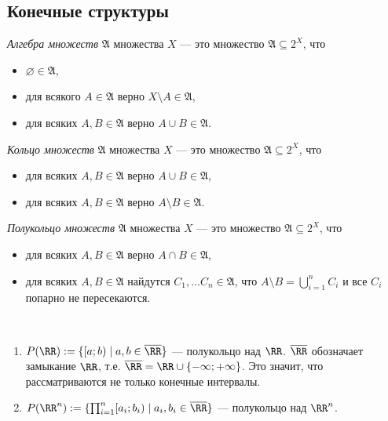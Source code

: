 \documentclass[12pt,a4paper]{article}
\begin{document}
    \subsection{Конечные структуры}

    \begin{definition}
        \emph{Алгебра множеств} $\mathfrak{A}$ множества $X$ --- это множество $\mathfrak{A} \subseteq 2^X$, что
        \begin{itemize}
            \item $\varnothing \in \mathfrak{A}$,
            \item для всякого $A \in \mathfrak{A}$ верно $X \setminus A \in \mathfrak{A}$,
            \item для всяких $A, B \in \mathfrak{A}$ верно $A \cup B \in \mathfrak{A}$.
        \end{itemize}
        
        \emph{Кольцо множеств} $\mathfrak{A}$ множества $X$ --- это множество $\mathfrak{A} \subseteq 2^X$, что
        \begin{itemize}
            \item для всяких $A, B \in \mathfrak{A}$ верно $A \cup B \in \mathfrak{A}$,
            \item для всяких $A, B \in \mathfrak{A}$ верно $A \setminus B \in \mathfrak{A}$.
        \end{itemize}
        
        \emph{Полукольцо множеств} $\mathfrak{A}$ множества $X$ --- это множество $\mathfrak{A} \subseteq 2^X$, что
        \begin{itemize}
            \item для всяких $A, B \in \mathfrak{A}$ верно $A \cap B \in \mathfrak{A}$,
            \item для всяких $A, B \in \mathfrak{A}$ найдутся $C_1, \dots C_n \in \mathfrak{A}$, что $A \setminus B = \bigcup_{i=1}^n C_i$ и все $C_i$ попарно не пересекаются.
        \end{itemize}
    \end{definition}

    \begin{example}\ 
        \begin{enumerate}
            \item $P(\RR) := \{[a; b) \mid a, b \in \overline{\RR}\}$ --- полукольцо над $\RR$. $\overline{\RR}$ обозначает замыкание $\RR$, т.е. $\overline{\RR} = \RR \cup \{-\infty; +\infty\}$. Это значит, что рассматриваются не только конечные интервалы.
            \item $P(\RR^n) := \{\prod_{i=1}^n [a_i; b_i) \mid a_i, b_i \in \overline{\RR}\}$ --- полукольцо над $\RR^n$.
        \end{enumerate}
    \end{example}
\end{document}

